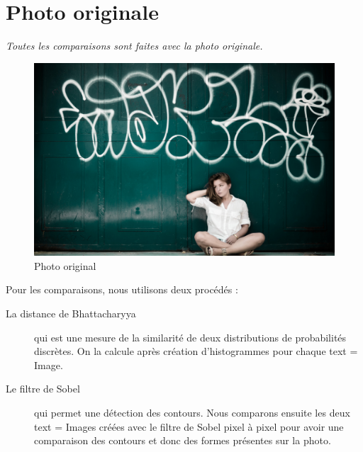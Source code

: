 \section{Photo originale}\label{photo-originale}

\emph{Toutes les comparaisons sont faites avec la photo originale.}

\begin{figure}[htbp]
\centering
\includegraphics{../../photos/original.jpg}
\caption{Photo original}
\end{figure}

Pour les comparaisons, nous utilisons deux procédés :

\begin{description}
\item[La distance de Bhattacharyya] qui est une mesure de la similarité de deux
  distributions de probabilités discrètes. On la calcule après création
  d'histogrammes pour chaque text = Image.
\item[Le filtre de Sobel] qui permet une détection des contours. Nous comparons
  ensuite les deux text = Images créées avec le filtre de Sobel pixel à pixel pour
  avoir une comparaison des contours et donc des formes présentes sur la photo.
\end{description}